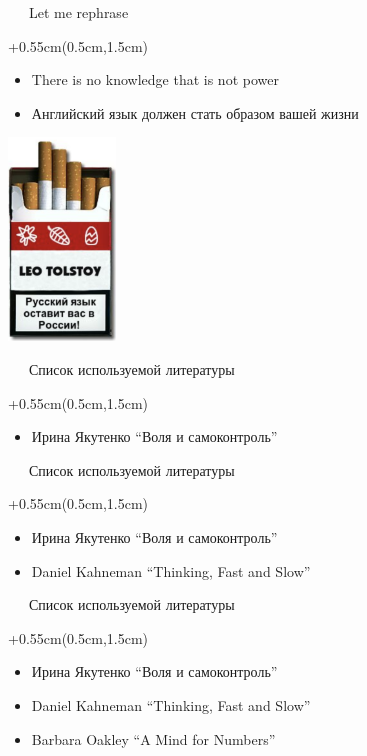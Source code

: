\documentclass[xetex,18pt,aspectratio=169]{beamer}
\begin{document}
\begin{Large}
\begin{frame}{\ \ \ Let me rephrase}
\begin{textblock*}{\framewidth+0.55cm}(0.5cm,1.5cm)
\begin{itemize}
  \item There is no knowledge that is not power
  \item Английский язык должен стать образом вашей жизни
\end{itemize}
\begin{minipage}{\textwidth}
  \centering
  \includegraphics[height=5.4cm]{img/caution}
\end{minipage}
\end{textblock*}
\end{frame}

\begin{frame}{\ \ \ Список используемой литературы}
\begin{textblock*}{\framewidth+0.55cm}(0.5cm,1.5cm)
\begin{itemize}
  \item Ирина Якутенко ``Воля и самоконтроль''
\end{itemize}
\end{textblock*}
\end{frame}

\begin{frame}{\ \ \ Список используемой литературы}
\begin{textblock*}{\framewidth+0.55cm}(0.5cm,1.5cm)
\begin{itemize}
  \item Ирина Якутенко ``Воля и самоконтроль''
  \item Daniel Kahneman ``Thinking, Fast and Slow''
\end{itemize}
\end{textblock*}
\end{frame}

\begin{frame}{\ \ \ Список используемой литературы}
\begin{textblock*}{\framewidth+0.55cm}(0.5cm,1.5cm)
\begin{itemize}
  \item Ирина Якутенко ``Воля и самоконтроль''
  \item Daniel Kahneman ``Thinking, Fast and Slow''
  \item Barbara Oakley ``A Mind for Numbers''
\end{itemize}
\end{textblock*}
\end{frame}


\end{Large}
\end{document}

